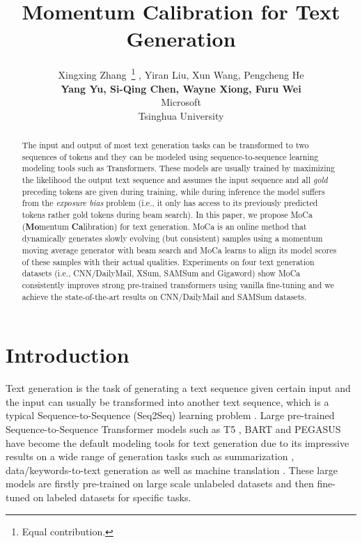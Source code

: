 \documentclass{article}
\title{Momentum Calibration for Text Generation}
\author{Xingxing Zhang~\thanks{Equal contribution.} , Yiran Liu, Xun Wang, Pengcheng He \\
 {\bf Yang Yu, Si-Qing Chen, Wayne Xiong, Furu Wei} \\
 Microsoft \\
 Tsinghua University \\
}
\begin{document}
\maketitle

\begin{abstract}
The input and output of most text generation tasks can be transformed to two sequences of tokens and they can be modeled using sequence-to-sequence learning modeling tools such as Transformers. These models are usually trained by maximizing the likelihood the output text sequence and assumes the input sequence and all \emph{gold} preceding tokens are given during training, while during inference the model suffers from the \emph{exposure bias} problem (i.e., it only has access to its previously predicted tokens rather gold tokens during beam search). In this paper, we propose MoCa ({\bf Mo}mentum {\bf Ca}libration) for text generation. MoCa is an online method that dynamically generates slowly evolving (but consistent) samples using a momentum moving average generator with beam search and MoCa learns to align its model scores of these samples with their actual qualities. Experiments on four text generation datasets (i.e., CNN/DailyMail, XSum, SAMSum and Gigaword) show MoCa consistently improves strong pre-trained transformers using vanilla fine-tuning and we achieve the state-of-the-art results on CNN/DailyMail and SAMSum datasets.

\end{abstract}



\section{Introduction}
Text generation is the task of generating a text sequence given certain input and the input can usually be transformed into another text sequence, which is a typical Sequence-to-Sequence (Seq2Seq) learning problem \cite{sutskever2014sequence}.
Large pre-trained Sequence-to-Sequence Transformer models such as T5 \cite{raffel2020exploring}, BART \cite{lewis-etal-2020-bart} and PEGASUS \cite{zhang:2019:icml} have become the default modeling tools for text generation due to its impressive results on a wide range of generation tasks such as summarization \cite{lewis-etal-2020-bart,zhang:2019:icml}, data/keywords-to-text generation \cite{lin2019commongen} as well as machine translation \cite{liu2020multilingual}. These large models are firstly pre-trained on large scale unlabeled datasets and then fine-tuned on labeled datasets for specific tasks.
\end{document}
